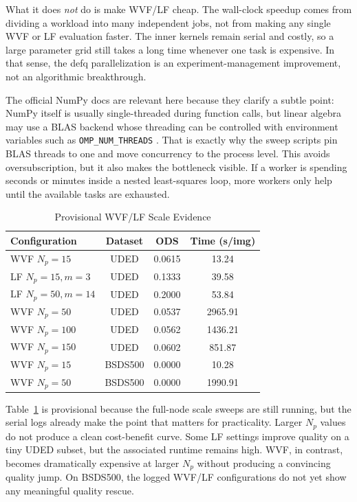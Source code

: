 \documentclass[conference]{IEEEtran}
\begin{document}
What it does \emph{not} do is make WVF/LF cheap. The wall-clock speedup comes from dividing a workload into many independent jobs, not from making any single WVF or LF evaluation faster. The inner kernels remain serial and costly, so a large parameter grid still takes a long time whenever one task is expensive. In that sense, the defq parallelization is an experiment-management improvement, not an algorithmic breakthrough.

The official NumPy docs are relevant here because they clarify a subtle point: NumPy itself is usually single-threaded during function calls, but linear algebra may use a BLAS backend whose threading can be controlled with environment variables such as \texttt{OMP\_NUM\_THREADS} \cite{numpyglobal}. That is exactly why the sweep scripts pin BLAS threads to one and move concurrency to the process level. This avoids oversubscription, but it also makes the bottleneck visible. If a worker is spending seconds or minutes inside a nested least-squares loop, more workers only help until the available tasks are exhausted.

\begin{table}[t]
\centering
\caption{Provisional WVF/LF Scale Evidence}
\label{tab:scale}
\scriptsize
\begin{tabular}{lccc}
\toprule
Configuration & Dataset & ODS & Time (s/img) \\
\midrule
WVF $N_p=15$ & UDED & 0.0615 & 13.24 \\
LF $N_p=15, m=3$ & UDED & 0.1333 & 39.58 \\
LF $N_p=50, m=14$ & UDED & 0.2000 & 53.84 \\
WVF $N_p=50$ & UDED & 0.0537 & 2965.91 \\
WVF $N_p=100$ & UDED & 0.0562 & 1436.21 \\
WVF $N_p=150$ & UDED & 0.0602 & 851.87 \\
WVF $N_p=15$ & BSDS500 & 0.0000 & 10.28 \\
WVF $N_p=50$ & BSDS500 & 0.0000 & 1990.91 \\
\bottomrule
\end{tabular}
\end{table}

Table~\ref{tab:scale} is provisional because the full-node scale sweeps are still running, but the serial logs already make the point that matters for practicality. Larger $N_p$ values do not produce a clean cost-benefit curve. Some LF settings improve quality on a tiny UDED subset, but the associated runtime remains high. WVF, in contrast, becomes dramatically expensive at larger $N_p$ without producing a convincing quality jump. On BSDS500, the logged WVF/LF configurations do not yet show any meaningful quality rescue.
\end{document}
